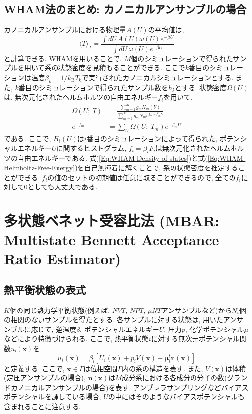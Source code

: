 \subsection{WHAM法のまとめ: カノニカルアンサンブルの場合}
カノニカルアンサンブルにおける物理量$A(U)$の平均値は, 
\begin{equation}
    \langle T \rangle_{T} =
    \frac{\int dU~A(U) \omega(U) e^{-\beta U}}{\int dU~\omega(U) e^{-\beta U}}
\end{equation}
と計算できる. 
WHAMを用いることで, $M$個のシミュレーションで得られたサンプルを用いて系の状態密度を見積もることができる. 
ここで$k$番目のシミュレーションは温度$\beta_{k} = 1 / k_{\mathrm{B}} T_{k}$で実行されたカノニカルシミュレーションとする. 
また, $k$番目のシミュレーションで得られたサンプル数を$h_{k}$とする. 
状態密度$\Omega(U)$は, 無次元化されたヘルムホルツの自由エネルギー$f_{i}$を用いて, 
\begin{align}
    \Omega(U;~T) &=
    \frac{\sum_{m=1}^{M} g_{m} H_{m}(U)}{\sum_{m=1}^{M} g_{m} N_{m} e^{f_{m} - \beta_{m} U}}
    \label{Eq:WHAM-Density-of-states}
    \\
    e^{-f_{m}} &=
    \sum_{U} \Omega (U;~T_{m}) e^{-\beta_{m}U}
    \label{Eq:WHAM-Helmholtz-Free-Energy}
\end{align}
である. ここで, $H_{i}(U)$は$i$番目のシミュレーションによって得られた, ポテンシャルエネルギー$U$に関するヒストグラム, $f_{i} = \beta_{i} F_{i}$は無次元化されたヘルムホルツの自由エネルギーである. 
式(\ref{Eq:WHAM-Density-of-states})と式(\ref{Eq:WHAM-Helmholtz-Free-Energy})を自己無撞着に解くことで, 系の状態密度を推定することができる. 
$f_{i}$の値のセットの初期値は任意に取ることができるので, 全ての$f_{i}$に対して0としても大丈夫である. 

\section{多状態ベネット受容比法 (MBAR: Multistate Bennett Acceptance Ratio Estimator)}
\subsection{熱平衡状態の表式}
$K$個の同じ熱力学平衡状態(例えば, $NVT$, $NPT$, $\mu NT$アンサンブルなど)から$N_{i}$個の相関のないサンプルを得たとする. 
各サンプルに対する状態は, 用いたアンサンブルに応じて, 逆温度$\beta$, ポテンシャルエネルギー$U$, 圧力$p$, 化学ポテンシャル$\mu$などにより特徴づけられる. 
ここで, 熱平衡状態$i$に対する無次元ポテンシャル関数$u_{i}(\bm{x})$を
\begin{equation}
    u_{i}(\bm{x}) =
    \beta_{i}
    \left[
        U_{i}(\bm{x}) + p_{i}V(\bm{x}) + \bm{\mu}_{i}^{t} \bm{n}(\bm{x})
    \right]
\end{equation}
と定義する. 
ここで, $\bm{x} \in \Gamma$は位相空間$\Gamma$内の系の構造を表す. 
また, $V(\bm{x})$は体積(定圧アンサンブルの場合), $\bm{n}(\bm{x})$は$M$成分系における各成分の分子の数(グランドカノニカルアンサンブルの場合)を表す. 
アンブレラサンプリングなどバイアスポテンシャルを課している場合, $U$の中にはそのようなバイアスポテンシャルも含まれることに注意する. 

